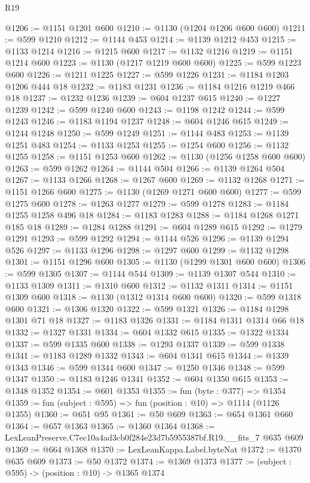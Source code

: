 \begin{lexlean}{R19}
\begin{coremodule}
@1206 := @1151 @1201 @600
@1210 := @1130 (@1204 @1206 @600 @600)
@1211 := @599 @1210
@1212 := @1144 @453
@1214 := @1139 @1212 @453
@1215 := @1133 @1214
@1216 := @1215 @600
@1217 := @1132 @1216
@1219 := @1151 @1214 @600
@1223 := @1130 (@1217 @1219 @600 @600)
@1225 := @599 @1223 @600
@1226 := @1211 @1225
@1227 := @599 @1226
@1231 := @1184 @1203 @1206 @444 @18
@1232 := @1183 @1231
@1236 := @1184 @1216 @1219 @466 @18
@1237 := @1232 @1236
@1239 := @604 @1237 @615
@1240 := @1227 @1239
@1242 := @599 @1240 @600
@1243 := @1198 @1242
@1244 := @599 @1243
@1246 := @1183 @1194 @1237
@1248 := @604 @1246 @615
@1249 := @1244 @1248
@1250 := @599 @1249
@1251 := @1144 @483
@1253 := @1139 @1251 @483
@1254 := @1133 @1253
@1255 := @1254 @600
@1256 := @1132 @1255
@1258 := @1151 @1253 @600
@1262 := @1130 (@1256 @1258 @600 @600)
@1263 := @599 @1262
@1264 := @1144 @504
@1266 := @1139 @1264 @504
@1267 := @1133 @1266
@1268 := @1267 @600
@1269 := @1132 @1268
@1271 := @1151 @1266 @600
@1275 := @1130 (@1269 @1271 @600 @600)
@1277 := @599 @1275 @600
@1278 := @1263 @1277
@1279 := @599 @1278
@1283 := @1184 @1255 @1258 @496 @18
@1284 := @1183 @1283
@1288 := @1184 @1268 @1271 @185 @18
@1289 := @1284 @1288
@1291 := @604 @1289 @615
@1292 := @1279 @1291
@1293 := @599 @1292
@1294 := @1144 @526
@1296 := @1139 @1294 @526
@1297 := @1133 @1296
@1298 := @1297 @600
@1299 := @1132 @1298
@1301 := @1151 @1296 @600
@1305 := @1130 (@1299 @1301 @600 @600)
@1306 := @599 @1305
@1307 := @1144 @544
@1309 := @1139 @1307 @544
@1310 := @1133 @1309
@1311 := @1310 @600
@1312 := @1132 @1311
@1314 := @1151 @1309 @600
@1318 := @1130 (@1312 @1314 @600 @600)
@1320 := @599 @1318 @600
@1321 := @1306 @1320
@1322 := @599 @1321
@1326 := @1184 @1298 @1301 @71 @18
@1327 := @1183 @1326
@1331 := @1184 @1311 @1314 @66 @18
@1332 := @1327 @1331
@1334 := @604 @1332 @615
@1335 := @1322 @1334
@1337 := @599 @1335 @600
@1338 := @1293 @1337
@1339 := @599 @1338
@1341 := @1183 @1289 @1332
@1343 := @604 @1341 @615
@1344 := @1339 @1343
@1346 := @599 @1344 @600
@1347 := @1250 @1346
@1348 := @599 @1347
@1350 := @1183 @1246 @1341
@1352 := @604 @1350 @615
@1353 := @1348 @1352
@1354 := @601 @1353
@1355 := fun (byte : @377) => @1354
@1359 := fun (subject : @595) => fun (position : @10) => @1114 (@1126 @1355)
@1360 := @651 @95
@1361 := @50 @609
@1363 := @654 @1361 @660
@1364 := @657 @1363
@1365 := @1360 @1364
@1368 := LexLeanPreserve.C7ec10a4ad3cb0f284e23d7b5955387bf.R19.__fits_7 @635 @609
@1369 := @664 @1368
@1370 := LexLeanKappa.Label.byteNat
@1372 := @1370 @635 @609
@1373 := @50 @1372
@1374 := @1369 @1373
@1377 := (subject : @595) -> (position : @10) -> @1365 @1374

\end{coremodule}
\end{lexlean}
